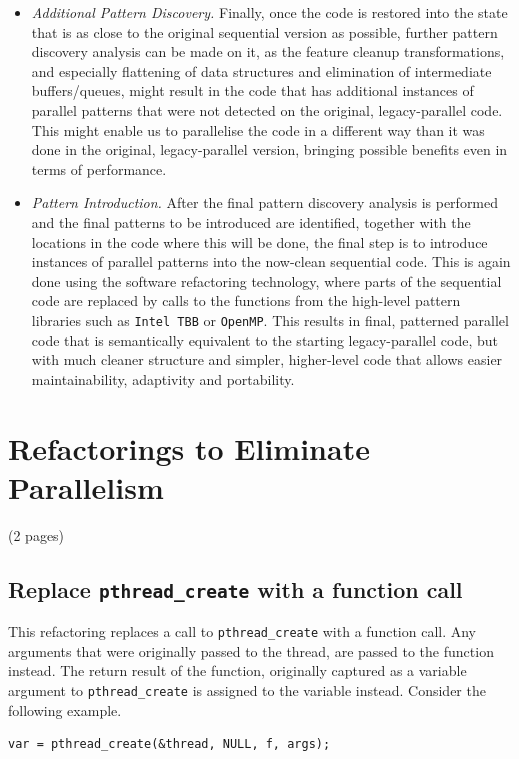 \documentclass{llncs}
\begin{document}
\begin{itemize}
\item \emph{Additional Pattern Discovery.} Finally, once the code is restored into the state that is as close to the original sequential version as possible, further pattern discovery analysis can be made on it, as the feature cleanup transformations, and especially flattening of data structures and elimination of intermediate buffers/queues, might result in the code that has additional instances of parallel patterns that were not detected on the original, legacy-parallel code. This might enable us to parallelise the code in a different way than it was done in the original, legacy-parallel version, bringing possible benefits even in terms of performance.

\item \emph{Pattern Introduction.} After the final pattern discovery analysis is performed and the final patterns to be introduced are identified, together with the locations in the code where this will be done, the final step is to introduce instances of parallel patterns into the now-clean sequential code. This is again done using the software refactoring technology, where parts of the sequential code are replaced by calls to the functions from the high-level pattern libraries such as \lstinline{Intel TBB} or \lstinline{OpenMP}. This results in final, patterned parallel code that is semantically equivalent to the starting legacy-parallel code, but with much cleaner structure and simpler, higher-level code that allows easier maintainability, adaptivity and portability.
\end{itemize}

\section{Refactorings to Eliminate Parallelism} (2 pages)

\subsection{Replace \lstinline|pthread_create| with a function call}

This refactoring replaces a call to \lstinline|pthread_create| with a function call. Any arguments that were originally passed to the thread, are passed to the function instead. The return result of the function, originally captured as a variable argument to \lstinline|pthread_create| is assigned to the variable instead. Consider the following example.

\begin{lstlisting}[frame=single]
var = pthread_create(&thread, NULL, f, args);
\end{lstlisting}
\end{document}
